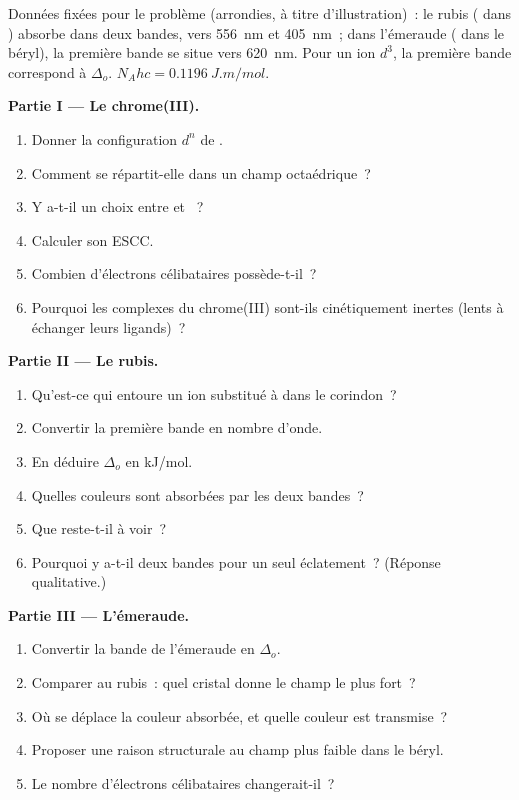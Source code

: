 \begin{problem}
\label{pb:b2:ligand-field:1}
Données fixées pour le problème (arrondies, à titre d'illustration)~: le rubis ( dans ) absorbe
dans deux bandes, vers \qty{556}{nm} et \qty{405}{nm}~; dans l'émeraude ( dans le béryl), la
première bande se situe vers \qty{620}{nm}. Pour un ion $d^3$, la première bande correspond à
$\Delta_o$. $N_Ahc = \qty{0.1196}{J.m/mol}$.

\medskip
\noindent\textbf{Partie I --- Le chrome(III).}
\begin{enumerate}
  \item Donner la configuration $d^n$ de .
  \item Comment se répartit-elle dans un champ octaédrique~?
  \item Y a-t-il un choix entre  et ~?
  \item Calculer son ESCC.
  \item Combien d'électrons célibataires possède-t-il~?
  \item Pourquoi les complexes du chrome(III) sont-ils cinétiquement inertes (lents à échanger leurs ligands)~?
\end{enumerate}

\medskip
\noindent\textbf{Partie II --- Le rubis.}
\begin{enumerate}[resume]
  \item Qu'est-ce qui entoure un ion  substitué à  dans le corindon~?
  \item Convertir la première bande en nombre d'onde.
  \item En déduire $\Delta_o$ en \unit{kJ/mol}.
  \item Quelles couleurs sont absorbées par les deux bandes~?
  \item Que reste-t-il à voir~?
  \item Pourquoi y a-t-il deux bandes pour un seul éclatement~? (Réponse qualitative.)
\end{enumerate}

\medskip
\noindent\textbf{Partie III --- L'émeraude.}
\begin{enumerate}[resume]
  \item Convertir la bande de l'émeraude en $\Delta_o$.
  \item Comparer au rubis~: quel cristal donne le champ le plus fort~?
  \item Où se déplace la couleur absorbée, et quelle couleur est transmise~?
  \item Proposer une raison structurale au champ plus faible dans le béryl.
  \item Le nombre d'électrons célibataires changerait-il~?
\end{enumerate}


\end{problem}
